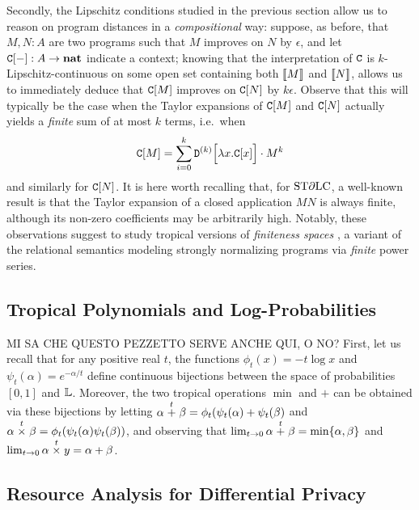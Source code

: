 Secondly, the Lipschitz conditions studied in the previous section allow us to reason on program distances in a \emph{compositional} way: suppose, as before, that $M,N:A$ are two programs such that $M$ improves on $N$ by $\epsilon$, and let $\mathtt{C}[-]:A \to \mathbf{nat}$ indicate a context; knowing that the interpretation of $\mathtt{C}$ is $k$-Lipschitz-continuous on some open set containing both $\llbracket M\rrbracket$ and $\llbracket N\rrbracket$, allows us to immediately deduce that $\mathtt{C}[M]$ improves on $\mathtt{C}[N]$ by $k \epsilon$. 
Observe that this will typically be the case when the Taylor expansions of $\mathtt{C}[M]$ and $\mathtt{C}[N]$ actually yields a \emph{finite} sum of at most $k$ terms, i.e.~when 
\begin{align}
\mathtt{C}[M] = \sum_{i=0}^{k} \mathtt{D}^{(k)}\Big[\lambda x.\mathtt{C}[x]\Big]\cdot M^{k}
\end{align}
and similarly for $\mathtt{C}[N]$. It is here worth recalling that, for $\mathrm{ST}\partial\mathrm{LC}$, a well-known result \cite{} is that the Taylor expansion of a closed application $MN$ is always finite, although its non-zero coefficients may be arbitrarily high. 
Notably, these observations suggest to study tropical versions of \emph{finiteness spaces} \cite{}, 
a variant of the relational semantics modeling strongly normalizing programs via \emph{finite} power series.





\subsection{Tropical Polynomials and Log-Probabilities}

{\color{red}MI SA CHE QUESTO PEZZETTO SERVE ANCHE QUI, O NO?}
First, let us recall that for any positive real $t$, the functions $\phi_{t}(x)=-t\log x$ and $\psi_{t}(\alpha)=e^{-\alpha/t}$ define continuous bijections between the space of probabilities $[0,1]$ and $\mathbb{L}$. Moreover, the two tropical  operations $\min$ and $+$ can be obtained via these bijections by letting $\alpha\stackrel{t}{+}\beta=\phi_{t}(\psi_{t}(\alpha)+\psi_{t}(\beta)$ and $\alpha\stackrel{t}{\times} \beta=\phi_{t}(\psi_{t}(\alpha)\psi_{t}(\beta))$, and observing that $\lim_{t\to 0}\alpha\stackrel{t}{+} \beta= \min\{\alpha,\beta\}$ and $\lim_{t\to 0}\alpha\stackrel{t}{\times}y= \alpha+\beta$. 




\subsection{Resource Analysis for Differential Privacy}

